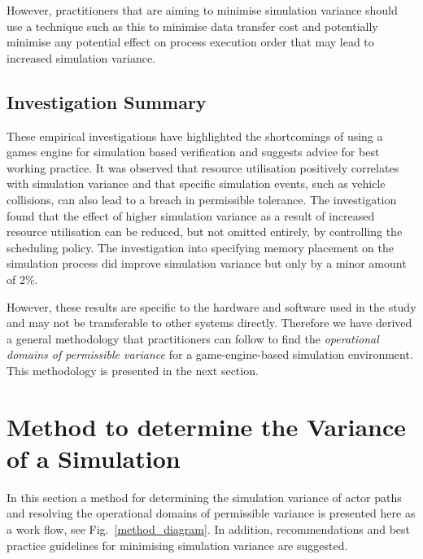 However, practitioners that are aiming to minimise simulation variance should use a technique such as this to minimise data transfer cost and potentially minimise any potential effect on process execution order that may lead to increased simulation variance. 


\DIFaddbegin 

\DIFaddend \subsection{Investigation Summary} \label{s:empirical_summary} 
These empirical investigations have highlighted the shortcomings of using a games engine for simulation based verification and suggests advice for best working practice. It was observed that resource utilisation positively correlates with simulation variance and that specific simulation events, such as vehicle collisions, can also lead to a breach in permissible tolerance. The investigation found that the effect of higher simulation variance as a result of increased resource utilisation can be reduced, but not omitted entirely, by controlling the scheduling policy. The investigation into specifying memory placement on the simulation process did improve simulation variance but only by a minor amount of 2\%.

However, these results are specific to the hardware and software used in the study and may not be transferable to other systems directly. Therefore we have derived a general methodology that practitioners can follow to find the \textit{operational domains of permissible variance} for a game-engine-based simulation environment. This methodology is presented in the next section. 


\DIFaddbegin 

\DIFaddend \section{Method to determine the Variance of a Simulation} \label{s:methodology}
In this section a method for determining the simulation variance of actor paths and resolving the operational domains of permissible variance is presented here as a work flow, see Fig.~\ref{method_diagram}. In addition, recommendations and best practice guidelines for minimising simulation variance are suggested.

